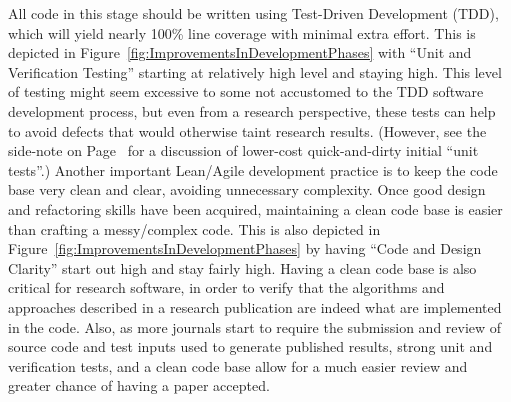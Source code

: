 \documentclass[11pt]{SANDreport}
\begin{document}
All code in this stage should be written using Test-Driven Development
(TDD), which will yield nearly 100\% line coverage with minimal extra
effort.  This is depicted in
Figure~\ref{fig:ImprovementsInDevelopmentPhases} with ``Unit and
Verification Testing'' starting at relatively high level and staying
high.  This level of testing might seem excessive to some not
accustomed to the TDD software development process, but even from a
research perspective, these tests can help to avoid defects that would
otherwise taint research results.  (However, see the side-note on
Page~\pageref{levels_of_unit_testing} for a discussion of lower-cost
quick-and-dirty initial ``unit tests''.)  Another important Lean/Agile
development practice is to keep the code base very clean and clear,
avoiding unnecessary complexity.  Once good design and refactoring
skills have been acquired, maintaining a clean code base is easier
than crafting a messy/complex code.  This is also depicted in
Figure~\ref{fig:ImprovementsInDevelopmentPhases} by having ``Code and
Design Clarity'' start out high and stay fairly high.  Having a clean
code base is also critical for research software, in order to verify
that the algorithms and approaches described in a research publication
are indeed what are implemented in the code.  Also, as more journals
start to require the submission and review of source code and test
inputs used to generate published results, strong unit and
verification tests, and a clean code base allow for a much easier
review and greater chance of having a paper accepted.
\end{document}
